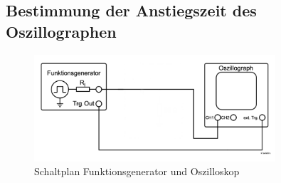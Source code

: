 \documentclass{article}
\begin{document}
 \subsection*{Bestimmung der Anstiegszeit des Oszillographen}
     \begin{figure}[H]
         \centering
         \includegraphics[width=0.8\textwidth]{figs/Aufbau_0_1_Oszilloskop.png}
         \caption{Schaltplan Funktionsgenerator und Oszilloskop~\cite{anleitung}}
         \label{fig:aufbau_0_1_oszilloskop.png}
     \end{figure}
\end{document}
